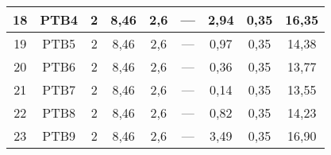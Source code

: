 \begin{table}[h!]
\begin{tabular}{|c|c|c|c|c|c|c|c|c|}
	18                 & PTB4               & 2                                                    & 8,46                                        & 2,6                                           & ---                                           & 2,94                                             & 0,35                                            & 16,35                                                             \\ \hline
	19                 & PTB5               & 2                                                    & 8,46                                        & 2,6                                           & ---                                           & 0,97                                             & 0,35                                            & 14,38                                                             \\ \hline
	20                 & PTB6               & 2                                                    & 8,46                                        & 2,6                                           & ---                                           & 0,36                                             & 0,35                                            & 13,77                                                             \\ \hline
	21                 & PTB7               & 2                                                    & 8,46                                        & 2,6                                           & ---                                           & 0,14                                             & 0,35                                            & 13,55                                                             \\ \hline
	22                 & PTB8               & 2                                                    & 8,46                                        & 2,6                                           & ---                                           & 0,82                                             & 0,35                                            & 14,23                                                             \\ \hline
	23                 & PTB9               & 2                                                    & 8,46                                        & 2,6                                           & ---                                           & 3,49                                             & 0,35                                            & 16,90                                                             \\ \hline

\end{tabular}
\end{table}
